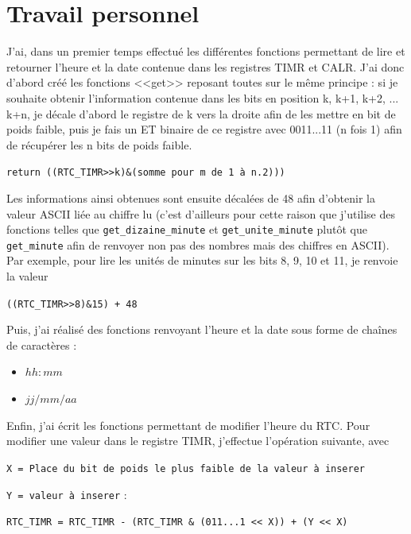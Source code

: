 \documentclass[a4paper]{report}
\begin{document}
\section{Travail personnel}
J'ai, dans un premier temps effectué les différentes fonctions permettant de lire et retourner l'heure et la date contenue dans les registres TIMR et CALR.
J'ai donc d'abord créé les fonctions <<get>> reposant toutes sur le même principe :
si je souhaite obtenir l'information contenue dans les bits en position k, k+1, k+2, ... k+n, je décale d'abord le registre de k vers la droite afin de les mettre en bit de poids faible, puis je fais un ET binaire de ce registre avec 0011...11 (n fois 1) afin de récupérer les n bits de poids faible.

\begin{center}
	\texttt{return ((RTC\_TIMR>>k)\&(somme pour m de 1 à n.2)))}
\end{center}

Les informations ainsi obtenues sont ensuite décalées de 48 afin d'obtenir la valeur ASCII liée au chiffre lu
(c'est d’ailleurs pour cette raison que j'utilise des fonctions telles que \texttt{get\_dizaine\_minute} et \texttt{get\_unite\_minute} plutôt que \texttt{get\_minute} afin de renvoyer non pas des nombres mais des chiffres en ASCII).
Par exemple, pour lire les unités de minutes sur les bits 8, 9, 10 et 11, je renvoie la valeur

\begin{center}
	\texttt{((RTC\_TIMR>>8)\&15) + 48}
\end{center}

Puis, j'ai réalisé des fonctions renvoyant l'heure et la date sous forme de chaînes de caractères :
\begin{itemize}
\item $hh:mm$
\item $jj/mm/aa$
\end{itemize}

Enfin, j'ai écrit les fonctions permettant de modifier l'heure du RTC.
Pour modifier une valeur dans le registre TIMR, j'effectue l'opération suivante, avec

\texttt{X = Place du bit de poids le plus faible de la valeur à inserer}

\texttt{Y = valeur à inserer} :

\begin{center}
	\texttt{RTC\_TIMR = RTC\_TIMR - (RTC\_TIMR \& (011...1 << X)) + (Y << X)}
\end{center}
\end{document}
